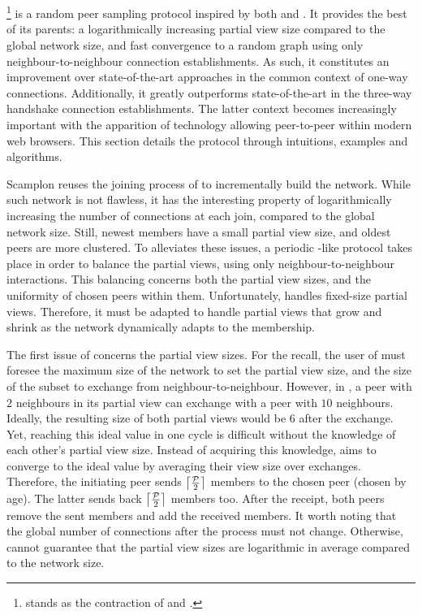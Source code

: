 
\section{\SCAMPLON{}}
\label{sec:proposal}

\SCAMPLON{}\footnote{\SCAMPLON{} stands as the contraction of \SCAMP{} and
  \CYCLON{}.} is a random peer sampling protocol inspired by both \SCAMP{} and
\CYCLON{}. It provides the best of its parents: a logarithmically increasing
partial view size compared to the global network size, and fast convergence to
a random graph using only neighbour-to-neighbour connection establishments. As
such, it constitutes an improvement over state-of-the-art approaches in the
common context of one-way connections. Additionally, it greatly outperforms
state-of-the-art in the three-way handshake connection establishments. The
latter context becomes increasingly important with the apparition of technology
allowing peer-to-peer within modern web browsers. This section details the
\SCAMPLON{} protocol through intuitions, examples and algorithms.

\begin{asparadesc}
\item [Scamplon] reuses the joining process of \SCAMP{} to incrementally build
  the network. While such network is not flawless, it has the interesting
  property of logarithmically increasing the number of connections at each
  join, compared to the global network size. Still, newest members have a small
  partial view size, and oldest peers are more clustered. To alleviates these
  issues, a periodic \CYCLON{}-like protocol takes place in order to balance
  the partial views, using only neighbour-to-neighbour interactions. This
  balancing concerns both the partial view sizes, and the uniformity of chosen
  peers within them. Unfortunately, \CYCLON{} handles fixed-size partial
  views. Therefore, it must be adapted to handle partial views that grow and
  shrink as the network dynamically adapts to the membership.
\end{asparadesc}

The first issue of \CYCLON{} concerns the partial view sizes. For the recall,
the user of \CYCLON{} must foresee the maximum size of the network to set the
partial view size, and the size of the subset to exchange from
neighbour-to-neighbour.  However, in \SCAMPLON{}, a peer with $2$ neighbours in
its partial view can exchange with a peer with $10$ neighbours. Ideally, the
resulting size of both partial views would be $6$ after the exchange. Yet,
reaching this ideal value in one cycle is difficult without the knowledge of
each other's partial view size. Instead of acquiring this knowledge,
\SCAMPLON{} aims to converge to the ideal value by averaging their view size
over exchanges. Therefore, the initiating peer sends
$\left\lceil\mathcal{P}\over{2}\right\rceil$ members to the chosen peer (chosen
by age). The latter sends back $\left\lceil\mathcal{P}\over{2}\right\rceil$
members too. After the receipt, both peers remove the sent members and add the
received members. It worth noting that the global number of connections after
the process must not change. Otherwise, \SCAMPLON{} cannot guarantee that the
partial view sizes are logarithmic in average compared to the network size.

